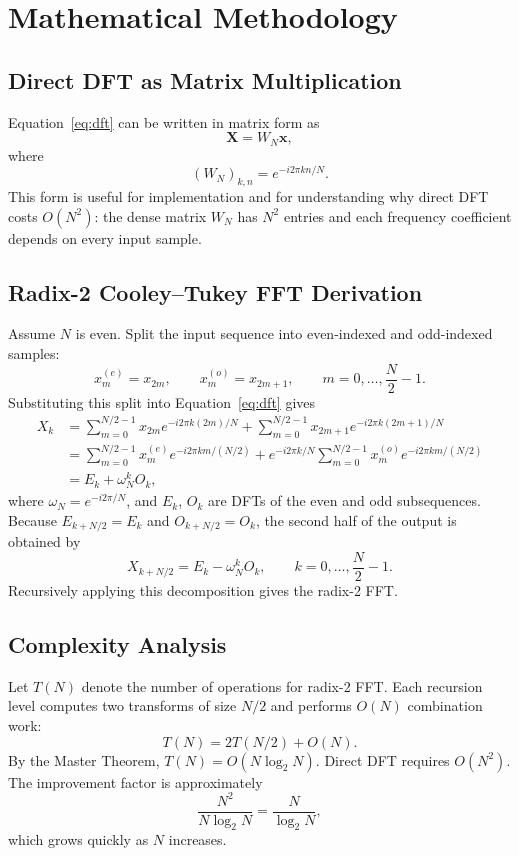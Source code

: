 \documentclass{zc-ust-hw}
\begin{document}
\section{Mathematical Methodology}
\subsection{Direct DFT as Matrix Multiplication}
Equation~\eqref{eq:dft} can be written in matrix form as
\begin{equation}
\mathbf{X}=W_N\mathbf{x},
\end{equation}
where
\begin{equation}
(W_N)_{k,n}=e^{-i2\pi kn/N}.
\end{equation}
This form is useful for implementation and for understanding why direct DFT costs \(O(N^2)\): the dense matrix \(W_N\) has \(N^2\) entries and each frequency coefficient depends on every input sample.

\subsection{Radix-2 Cooley--Tukey FFT Derivation}
Assume \(N\) is even. Split the input sequence into even-indexed and odd-indexed samples:
\[
x^{(e)}_m=x_{2m}, \qquad x^{(o)}_m=x_{2m+1}, \qquad m=0,\dots,\frac{N}{2}-1.
\]
Substituting this split into Equation~\eqref{eq:dft} gives
\begin{align}
X_k
&=\sum_{m=0}^{N/2-1}x_{2m}e^{-i2\pi k(2m)/N}
+\sum_{m=0}^{N/2-1}x_{2m+1}e^{-i2\pi k(2m+1)/N}\\
&=\sum_{m=0}^{N/2-1}x^{(e)}_m e^{-i2\pi km/(N/2)}
+e^{-i2\pi k/N}\sum_{m=0}^{N/2-1}x^{(o)}_m e^{-i2\pi km/(N/2)}\\
&=E_k+\omega_N^k O_k,
\label{eq:fft_split}
\end{align}
where \(\omega_N=e^{-i2\pi/N}\), and \(E_k\), \(O_k\) are DFTs of the even and odd subsequences. Because \(E_{k+N/2}=E_k\) and \(O_{k+N/2}=O_k\), the second half of the output is obtained by
\begin{equation}
X_{k+N/2}=E_k-\omega_N^k O_k, \qquad k=0,\dots,\frac{N}{2}-1.
\end{equation}
Recursively applying this decomposition gives the radix-2 FFT.

\subsection{Complexity Analysis}
Let \(T(N)\) denote the number of operations for radix-2 FFT. Each recursion level computes two transforms of size \(N/2\) and performs \(O(N)\) combination work:
\begin{equation}
T(N)=2T(N/2)+O(N).
\end{equation}
By the Master Theorem, \(T(N)=O(N\log_2 N)\). Direct DFT requires \(O(N^2)\). The improvement factor is approximately
\[
\frac{N^2}{N\log_2N}=\frac{N}{\log_2N},
\]
which grows quickly as \(N\) increases.
\end{document}

